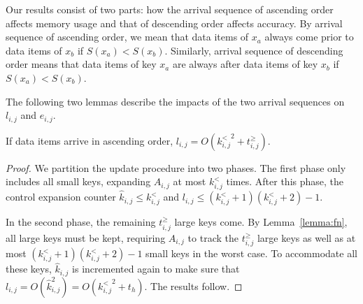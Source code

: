 Our results consist of two parts: how the arrival sequence of ascending order affects 
memory usage and that of descending order affects accuracy.
By arrival sequence of ascending order, we mean that data items of $x_a$ always
come prior to data items of $x_b$ if $S(x_a) < S(x_b)$. 
Similarly, arrival sequence of descending order means that data items of key 
$x_a$ are always after data items of key $x_b$ if $S(x_a) < S(x_b)$.

The following two lemmas describe the impacts of the two arrival sequences on $l_{i,j}$ and $e_{i,j}$.
\begin{lemma}
\label{lemma:seq_ascend}
If data items arrive in ascending order, $l_{i,j}=O({k^{<}_{i,j}}^2+t^{\ge}_{i,j})$.
\end{lemma}
\begin{proof}
We partition the update procedure into two phases.
The first phase only includes all small keys,
expanding $A_{i,j}$ at most $k^{<}_{i,j}$ times.
After this phase, the control expansion counter $\hat{k}_{i,j}\le k^{<}_{i,j}$ and $l_{i,j}\le(k^{<}_{i,j}+1)(k^{<}_{i,j}+2)-1$.

In the second phase, the remaining $t^{\ge}_{i,j}$ large keys come.
By Lemma~\ref{lemma:fn}, all large keys must be kept,
requiring $A_{i,j}$ to track the $t^{\ge}_{i,j}$ large keys as well 
as at most $(k^{<}_{i,j}+1)(k^{<}_{i,j}+2)-1$ small keys in the worst case.
To accommodate all these keys, $\hat{k}_{i,j}$ is incremented again to make sure that
$l_{i,j}=O(\hat{k}_{i,j}^2)=O({k^{<}_{i,j}}^2+t_h)$.
The results follow.
\end{proof}


